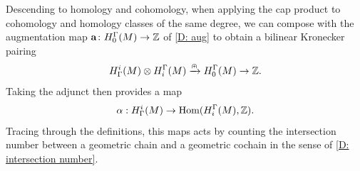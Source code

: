 Descending to homology and cohomology, when applying the cap product to cohomology and homology classes of the same degree, we can compose with the augmentation map $\mathbf{a} \colon H_0^\Gamma(M) \to \mathbb{Z}$ of \cref{D: aug} to obtain a bilinear Kronecker pairing
$$H^i_\Gamma(M) \otimes H_i^\Gamma(M) \xrightarrow{\nplus} H_0^\Gamma(M) \to \mathbb{Z}.$$
Taking the adjunct then provides a map
$$\alpha: H^i_\Gamma(M) \to \textup{Hom}(H_i^\Gamma(M),\mathbb{Z}).$$
Tracing through the definitions, this maps acts by counting the intersection number between a geometric chain and a geometric cochain in the sense of \cref{D: intersection number}.

